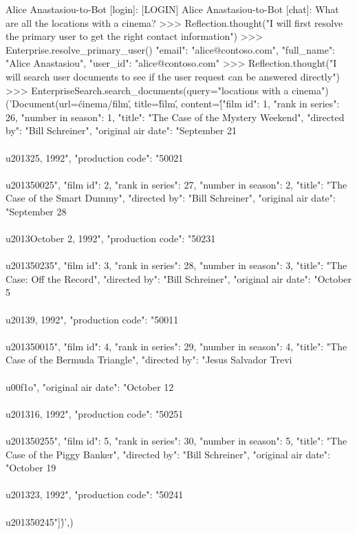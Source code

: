Alice Anastasiou-to-Bot [login]: [LOGIN]
Alice Anastasiou-to-Bot [chat]:  What are all the locations with a cinema? 
	>>>  Reflection.thought("I will first resolve the primary user to get the right contact information")
	>>>  Enterprise.resolve_primary_user()
{"email": "alice@contoso.com", "full_name": "Alice Anastasiou", "user_id": "alice@contoso.com"}
	>>>  Reflection.thought("I will search user documents to see if the user request can be answered directly")
	>>>  EnterpriseSearch.search_documents(query="locations with a cinema")
('Document(url=\'cinema/film\', title=\'film\', content=\'[{"film id": 1, "rank in series": 26, "number in season": 1, "title": "The Case of the Mystery Weekend", "directed by": "Bill Schreiner", "original air date": "September 21\\\\u201325, 1992", "production code": "50021\\\\u201350025"}, {"film id": 2, "rank in series": 27, "number in season": 2, "title": "The Case of the Smart Dummy", "directed by": "Bill Schreiner", "original air date": "September 28\\\\u2013October 2, 1992", "production code": "50231\\\\u201350235"}, {"film id": 3, "rank in series": 28, "number in season": 3, "title": "The Case: Off the Record", "directed by": "Bill Schreiner", "original air date": "October 5\\\\u20139, 1992", "production code": "50011\\\\u201350015"}, {"film id": 4, "rank in series": 29, "number in season": 4, "title": "The Case of the Bermuda Triangle", "directed by": "Jesus Salvador Trevi\\\\u00f1o", "original air date": "October 12\\\\u201316, 1992", "production code": "50251\\\\u201350255"}, {"film id": 5, "rank in series": 30, "number in season": 5, "title": "The Case of the Piggy Banker", "directed by": "Bill Schreiner", "original air date": "October 19\\\\u201323, 1992", "production code": "50241\\\\u201350245"}]\')',)
